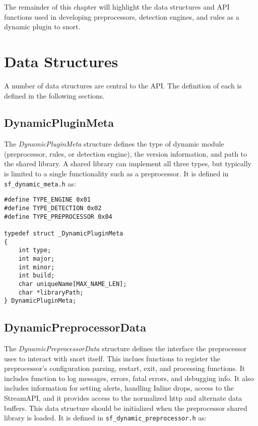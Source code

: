 \documentclass[english]{report}
\begin{document}
The remainder of this chapter will highlight the data structures
and API functions used in developing preprocessors, detection engines,
and rules as a dynamic plugin to snort.

\section{Data Structures}

A number of data structures are central to the API.  The definition
of each is defined in the following sections.

\subsection{DynamicPluginMeta}
The {\em DynamicPluginMeta} structure defines the type of dynamic module
(preprocessor, rules, or detection engine), the version
information, and path to the shared library.  A shared library can
implement all three types, but typically is limited to a single functionality
such as a preprocessor.  It is defined in \texttt{sf\_dynamic\_meta.h} as:

\begin{verbatim}
#define TYPE_ENGINE 0x01
#define TYPE_DETECTION 0x02
#define TYPE_PREPROCESSOR 0x04

typedef struct _DynamicPluginMeta
{
    int type;
    int major;
    int minor;
    int build;
    char uniqueName[MAX_NAME_LEN];
    char *libraryPath;
} DynamicPluginMeta;
\end{verbatim}

\subsection{DynamicPreprocessorData}
The {\em DynamicPreprocessorData} structure defines the interface the
preprocessor uses to interact with snort itself.  This inclues functions
to register the preprocessor's configuration parsing, restart, exit,
and processing functions.  It includes function to log messages,
errors, fatal errors, and debugging info.  It also includes information
for setting alerts, handling Inline drops, access to the StreamAPI, and
it provides access to the normalized http and alternate data buffers.
This data structure should be initialized when the preprocessor shared
library is loaded.  It is defined in \texttt{sf\_dynamic\_preprocessor.h} as:
\end{document}
